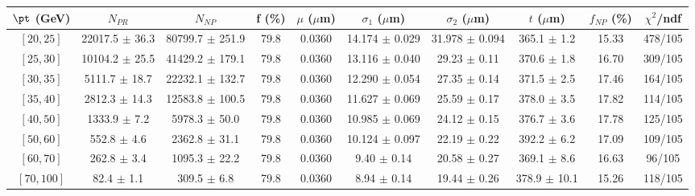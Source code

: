 \begin{tabular}{c||c|c|c|c|c|c|c||c|c}
$\pt$ (GeV) & $N_{PR}$ & $N_{NP}$ & f (\%) & $\mu$ ($\mu$m) & $\sigma_1$ ($\mu$m) & $\sigma_2$ ($\mu$m)  & $t$ ($\mu$m) & $f_{NP}$ (\%) & $\chi^2$/ndf \\
\hline
$[20, 25]$ & 22017.5 $\pm$ 36.3 & 80799.7 $\pm$ 251.9 & 79.8 & 0.0360 & 14.174 $\pm$ 0.029 & 31.978 $\pm$ 0.094 & 365.1 $\pm$ 1.2 & 15.33 & 478/105\\
$[25, 30]$ & 10104.2 $\pm$ 25.5 & 41429.2 $\pm$ 179.1 & 79.8 & 0.0360 & 13.116 $\pm$ 0.040 & 29.23 $\pm$ 0.11 & 370.6 $\pm$ 1.8 & 16.70 & 309/105\\
$[30, 35]$ & 5111.7 $\pm$ 18.7 & 22232.1 $\pm$ 132.7 & 79.8 & 0.0360 & 12.290 $\pm$ 0.054 & 27.35 $\pm$ 0.14 & 371.5 $\pm$ 2.5 & 17.46 & 164/105\\
$[35, 40]$ & 2812.3 $\pm$ 14.3 & 12583.8 $\pm$ 100.5 & 79.8 & 0.0360 & 11.627 $\pm$ 0.069 & 25.59 $\pm$ 0.17 & 378.0 $\pm$ 3.5 & 17.82 & 114/105\\
$[40, 50]$ & 1333.9 $\pm$ 7.2 & 5978.3 $\pm$ 50.0 & 79.8 & 0.0360 & 10.985 $\pm$ 0.069 & 24.12 $\pm$ 0.15 & 376.7 $\pm$ 3.6 & 17.78 & 125/105\\
$[50, 60]$ & 552.8 $\pm$ 4.6 & 2362.8 $\pm$ 31.1 & 79.8 & 0.0360 & 10.124 $\pm$ 0.097 & 22.19 $\pm$ 0.22 & 392.2 $\pm$ 6.2 & 17.09 & 109/105\\
$[60, 70]$ & 262.8 $\pm$ 3.4 & 1095.3 $\pm$ 22.2 & 79.8 & 0.0360 & 9.40 $\pm$ 0.14 & 20.58 $\pm$ 0.27 & 369.1 $\pm$ 8.6 & 16.63 & 96/105\\
$[70, 100]$ & 82.4 $\pm$ 1.1 & 309.5 $\pm$ 6.8 & 79.8 & 0.0360 & 8.94 $\pm$ 0.14 & 19.44 $\pm$ 0.26 & 378.9 $\pm$ 10.1 & 15.26 & 118/105\\
\end{tabular}
